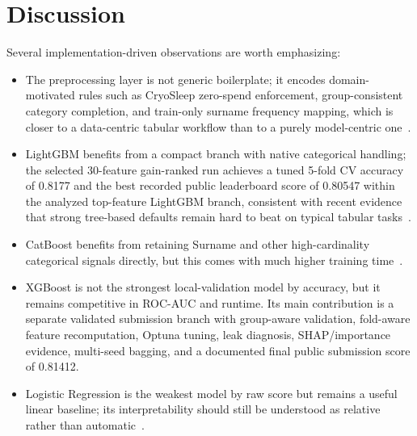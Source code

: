 \documentclass[conference]{IEEEtran}
\renewcommand{\texttt}[1]{\textnormal{#1}}
\begin{document}
\section{Discussion}
Several implementation-driven observations are worth emphasizing:
\begin{itemize}
\item The preprocessing layer is not generic boilerplate; it encodes domain-motivated rules such as CryoSleep zero-spend enforcement, group-consistent category completion, and train-only surname frequency mapping, which is closer to a data-centric tabular workflow than to a purely model-centric one~\cite{chicco2022tips,kapoor2023leakage,tschalzev2024datacentric}.
\item LightGBM benefits from a compact branch with native categorical handling; the selected 30-feature gain-ranked run achieves a tuned 5-fold CV accuracy of 0.8177 and the best recorded public leaderboard score of 0.80547 within the analyzed top-feature LightGBM branch, consistent with recent evidence that strong tree-based defaults remain hard to beat on typical tabular tasks~\cite{grinsztajn2022trees,grinsztajn2024betterdefault}.
\item CatBoost benefits from retaining \texttt{Surname} and other high-cardinality categorical signals directly, but this comes with much higher training time~\cite{matteucci2023encoders,avanzi2023highcardinality}.
\item XGBoost is not the strongest local-validation model by accuracy, but it remains competitive in ROC-AUC and runtime. Its main contribution is a separate validated submission branch with group-aware validation, fold-aware feature recomputation, Optuna tuning, leak diagnosis, SHAP/importance evidence, multi-seed bagging, and a documented final public submission score of 0.81412.
\item Logistic Regression is the weakest model by raw score but remains a useful linear baseline; its interpretability should still be understood as relative rather than automatic~\cite{dervovic2024logistic}.
\end{itemize}
\end{document}

